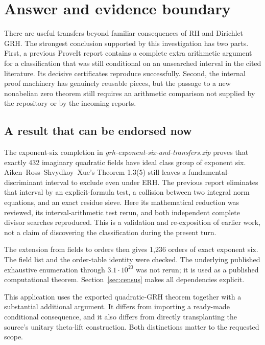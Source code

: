 \section{Answer and evidence boundary}

There are useful transfers beyond familiar consequences of RH and Dirichlet GRH. The strongest conclusion supported by this investigation has two parts. First, a previous ProveIt report contains a complete extra arithmetic argument for a classification that was still conditional on an unsearched interval in the cited literature. Its decisive certificates reproduce successfully. Second, the internal proof machinery has genuinely reusable pieces, but the passage to a new nonabelian zero theorem still requires an arithmetic comparison not supplied by the repository or by the incoming reports.

\subsection{A result that can be endorsed now}

The exponent-six completion in \emph{grh-exponent-six-and-transfers.zip} proves that exactly 432 imaginary quadratic fields have ideal class group of exponent six. Aiken--Ross--Shvydkoy--Xue's Theorem 1.3(5) still leaves a fundamental-discriminant interval to exclude even under ERH. The previous report eliminates that interval by an explicit-formula test, a collision between two integral norm equations, and an exact residue sieve. Here its mathematical reduction was reviewed, its interval-arithmetic test rerun, and both independent complete divisor searches reproduced. This is a validation and re-exposition of earlier work, not a claim of discovering the classification during the present turn.\cite{priorSix,EKN,ARSX}

The extension from fields to orders then gives 1,236 orders of exact exponent six. The field list and the order-table identity were checked. The underlying published exhaustive enumeration through $3.1\cdot10^{20}$ was not rerun; it is used as a published computational theorem. Section~\ref{sec:census} makes all dependencies explicit.

This application uses the exported quadratic-GRH theorem together with a substantial additional argument. It differs from importing a ready-made conditional consequence, and it also differs from directly transplanting the source's unitary theta-lift construction. Both distinctions matter to the requested scope.

